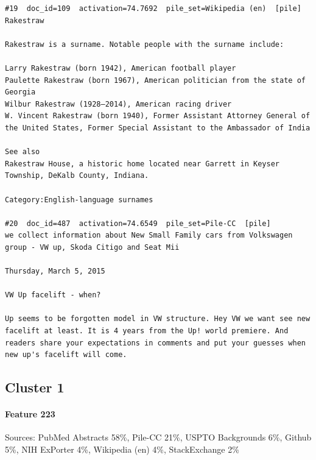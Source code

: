 \begin{verbatim}
#19  doc_id=109  activation=74.7692  pile_set=Wikipedia (en)  [pile]
Rakestraw

Rakestraw is a surname. Notable people with the surname include:

Larry Rakestraw (born 1942), American football player
Paulette Rakestraw (born 1967), American politician from the state of Georgia
Wilbur Rakestraw (1928–2014), American racing driver
W. Vincent Rakestraw (born 1940), Former Assistant Attorney General of the United States, Former Special Assistant to the Ambassador of India

See also
Rakestraw House, a historic home located near Garrett in Keyser Township, DeKalb County, Indiana.

Category:English-language surnames

#20  doc_id=487  activation=74.6549  pile_set=Pile-CC  [pile]
we collect information about New Small Family cars from Volkswagen group - VW up, Skoda Citigo and Seat Mii

Thursday, March 5, 2015

VW Up facelift - when?

Up seems to be forgotten model in VW structure. Hey VW we want see new facelift at least. It is 4 years from the Up! world premiere. And readers share your expectations in comments and put your guesses when new up's facelift will come.

\end{verbatim}

\subsection*{Cluster 1}

\paragraph*{Feature 223} Sources: PubMed Abstracts 58\%, Pile-CC 21\%, USPTO Backgrounds 6\%, Github 5\%, NIH ExPorter 4\%, Wikipedia (en) 4\%, StackExchange 2\%

